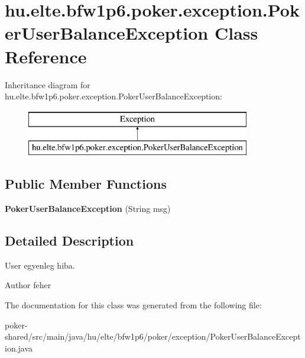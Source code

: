 \hypertarget{classhu_1_1elte_1_1bfw1p6_1_1poker_1_1exception_1_1_poker_user_balance_exception}{}\section{hu.\+elte.\+bfw1p6.\+poker.\+exception.\+Poker\+User\+Balance\+Exception Class Reference}
\label{classhu_1_1elte_1_1bfw1p6_1_1poker_1_1exception_1_1_poker_user_balance_exception}
Inheritance diagram for hu.\+elte.\+bfw1p6.\+poker.\+exception.\+Poker\+User\+Balance\+Exception\+:\begin{figure}[H]
\begin{center}
\leavevmode
\includegraphics[height=2.000000cm]{classhu_1_1elte_1_1bfw1p6_1_1poker_1_1exception_1_1_poker_user_balance_exception}
\end{center}
\end{figure}
\subsection*{Public Member Functions}
\begin{DoxyCompactItemize}
\item 
\hypertarget{classhu_1_1elte_1_1bfw1p6_1_1poker_1_1exception_1_1_poker_user_balance_exception_a71f63d2924e209e93f8dc243c14d49bc}{}{\bfseries Poker\+User\+Balance\+Exception} (String msg)\label{classhu_1_1elte_1_1bfw1p6_1_1poker_1_1exception_1_1_poker_user_balance_exception_a71f63d2924e209e93f8dc243c14d49bc}

\end{DoxyCompactItemize}


\subsection{Detailed Description}
User egyenleg hiba. \begin{DoxyAuthor}{Author}
feher 
\end{DoxyAuthor}


The documentation for this class was generated from the following file\+:\begin{DoxyCompactItemize}
\item 
poker-\/shared/src/main/java/hu/elte/bfw1p6/poker/exception/Poker\+User\+Balance\+Exception.\+java\end{DoxyCompactItemize}
